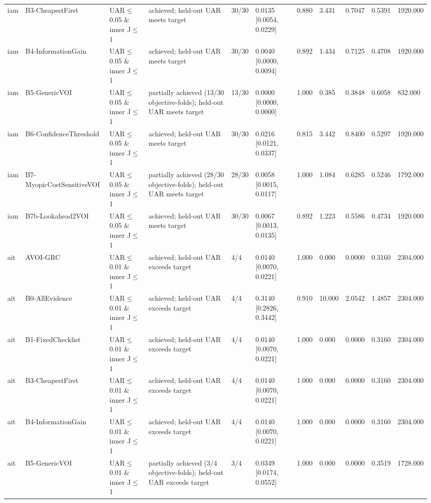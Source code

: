 \begin{table}[!ht]
{\begin{tabular}{lllllllllll}
iam & B3-CheapestFirst & UAR$\le$0.05 \& inner J$\le$1 & achieved; held-out UAR meets target & 30/30 & 0.0135 [0.0054, 0.0229] & 0.880 & 3.431 & 0.7047 & 0.5391 & 1920.000 \\
iam & B4-InformationGain & UAR$\le$0.05 \& inner J$\le$1 & achieved; held-out UAR meets target & 30/30 & 0.0040 [0.0000, 0.0094] & 0.892 & 1.434 & 0.7125 & 0.4708 & 1920.000 \\
iam & B5-GenericVOI & UAR$\le$0.05 \& inner J$\le$1 & partially achieved (13/30 objective-folds); held-out UAR meets target & 13/30 & 0.0000 [0.0000, 0.0000] & 1.000 & 0.385 & 0.3848 & 0.6058 & 832.000 \\
iam & B6-ConfidenceThreshold & UAR$\le$0.05 \& inner J$\le$1 & achieved; held-out UAR meets target & 30/30 & 0.0216 [0.0121, 0.0337] & 0.815 & 3.442 & 0.8400 & 0.5297 & 1920.000 \\
iam & B7-MyopicCostSensitiveVOI & UAR$\le$0.05 \& inner J$\le$1 & partially achieved (28/30 objective-folds); held-out UAR meets target & 28/30 & 0.0058 [0.0015, 0.0117] & 1.000 & 1.084 & 0.6285 & 0.5246 & 1792.000 \\
iam & B7b-Lookahead2VOI & UAR$\le$0.05 \& inner J$\le$1 & achieved; held-out UAR meets target & 30/30 & 0.0067 [0.0013, 0.0135] & 0.892 & 1.223 & 0.5586 & 0.4734 & 1920.000 \\
ait & AVOI-GRC & UAR$\le$0.01 \& inner J$\le$1 & achieved; held-out UAR exceeds target & 4/4 & 0.0140 [0.0070, 0.0221] & 1.000 & 0.000 & 0.0000 & 0.3160 & 2304.000 \\
ait & B0-AllEvidence & UAR$\le$0.01 \& inner J$\le$1 & achieved; held-out UAR exceeds target & 4/4 & 0.3140 [0.2826, 0.3442] & 0.910 & 10.000 & 2.0542 & 1.4857 & 2304.000 \\
ait & B1-FixedChecklist & UAR$\le$0.01 \& inner J$\le$1 & achieved; held-out UAR exceeds target & 4/4 & 0.0140 [0.0070, 0.0221] & 1.000 & 0.000 & 0.0000 & 0.3160 & 2304.000 \\
ait & B3-CheapestFirst & UAR$\le$0.01 \& inner J$\le$1 & achieved; held-out UAR exceeds target & 4/4 & 0.0140 [0.0070, 0.0221] & 1.000 & 0.000 & 0.0000 & 0.3160 & 2304.000 \\
ait & B4-InformationGain & UAR$\le$0.01 \& inner J$\le$1 & achieved; held-out UAR exceeds target & 4/4 & 0.0140 [0.0070, 0.0221] & 1.000 & 0.000 & 0.0000 & 0.3160 & 2304.000 \\
ait & B5-GenericVOI & UAR$\le$0.01 \& inner J$\le$1 & partially achieved (3/4 objective-folds); held-out UAR exceeds target & 3/4 & 0.0349 [0.0174, 0.0552] & 1.000 & 0.000 & 0.0000 & 0.3519 & 1728.000 \\

\end{tabular}}
\end{table}
